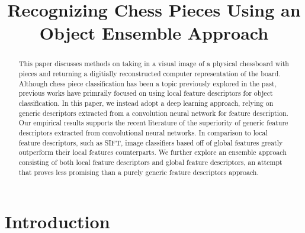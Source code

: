 \documentclass{article}
\title{Recognizing Chess Pieces Using an Object Ensemble Approach}
\begin{document}
%
\maketitle
%
\begin{abstract}
\hspace{\parindent} This paper discusses methods on taking in a visual image of a physical chessboard with pieces and returning a digitially reconstructed computer representation of the board. Although chess piece classification has been a topic previously explored in the past, previous works have primraily focused on using local feature descriptors for object classification. In this paper, we instead adopt a deep learning approach, relying on generic descriptors extracted from a convolution neural network for feature description. Our empirical results supports the recent literature of the superiority of generic feature descriptors extracted from convolutional neural networks. In comparison to local feature descriptors, such as SIFT, image classifiers based off of global features greatly outperform their local features counterparts. We further explore an ensemble approach consisting of both local feature descriptors and global feature descriptors, an attempt that proves less promising than a purely generic feature descriptors approach.\end{abstract}
%

%
\section{Introduction}
\label{sec:intro}
\end{document}
